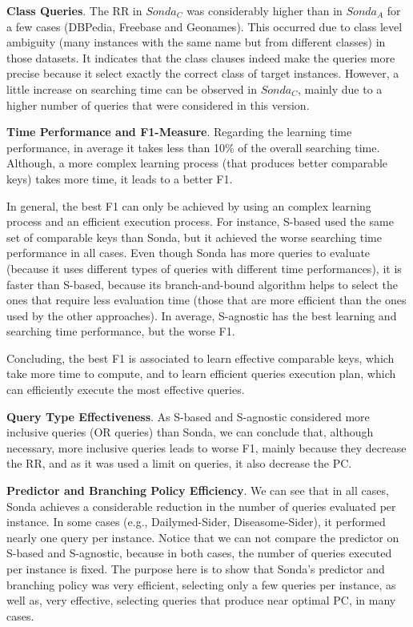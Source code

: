 \textbf{Class Queries}. The RR in $Sonda_C$ was considerably higher than in $Sonda_A$ for a few cases (DBPedia, Freebase and Geonames). This occurred due to class level ambiguity (many instances with the same name but from different classes) in those datasets. It indicates that the class clauses indeed make the queries more precise because it select exactly the correct class of target instances. However, a little increase on searching time can be observed in $Sonda_C$, mainly due to a higher number of queries that were considered in this version.

\textbf{Time Performance and F1-Measure}. Regarding the learning time performance, in average it takes less than 10\% of the overall searching time. Although, a more complex learning process (that produces better comparable keys) takes more time, it leads to a better F1. 

In general, the best F1 can only be achieved by using an complex learning process and an efficient execution process. For instance, S-based used the same set of comparable keys than Sonda, but it achieved the worse searching time performance in all cases. Even though Sonda has more queries to evaluate (because it uses different types of queries with different time performances), it is faster than S-based, because its  branch-and-bound algorithm helps to select the ones that require less evaluation time (those that are more efficient than the ones used by the other approaches).  In average, S-agnostic has the best learning and searching time performance, but the worse F1. 

Concluding, the best F1 is associated to learn effective comparable keys, which take more time to compute, and to learn efficient queries execution plan, which can efficiently execute the most effective queries. 
 
\textbf{Query Type Effectiveness}. As S-based and S-agnostic considered more inclusive queries (OR queries) than Sonda, we can conclude that, although necessary, more inclusive queries leads to worse F1, mainly because they decrease the RR, and as it was used a limit on queries, it also decrease the PC. 

\textbf{Predictor and Branching Policy Efficiency}. We can see that in all cases, Sonda achieves a considerable reduction in the number of queries evaluated per instance. In some cases (e.g., Dailymed-Sider, Diseasome-Sider), it performed nearly one query per instance. Notice that we can not compare the predictor on S-based and S-agnostic, because in both cases, the number of queries executed per instance is fixed. The purpose here is to show  that Sonda's predictor and branching policy was very efficient, selecting only a few queries per instance, as well as, very effective, selecting queries that produce near optimal PC, in many cases. 


